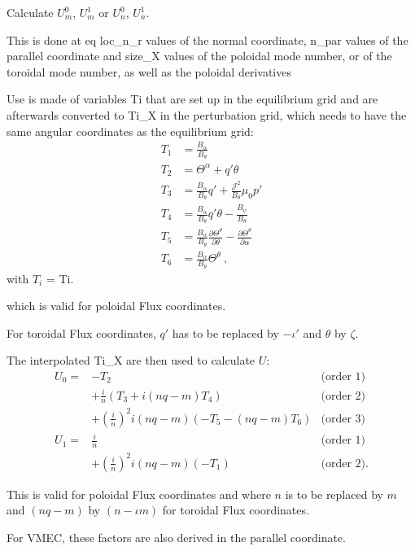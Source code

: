 Calculate $U_m^0$, $U_m^1$ or $U_n^0$, $U_n^1$. 

This is done at eq {\ttfamily loc\+\_\+n\+\_\+r} values of the normal coordinate, {\ttfamily n\+\_\+par} values of the parallel coordinate and {\ttfamily size\+\_\+X} values of the poloidal mode number, or of the toroidal mode number, as well as the poloidal derivatives

Use is made of variables {\ttfamily Ti} that are set up in the equilibrium grid and are afterwards converted to {\ttfamily Ti\+\_\+X} in the perturbation grid, which needs to have the same angular coordinates as the equilibrium grid\+: \[\begin{aligned} T_1 &= \frac{B_\alpha}{B_\theta} \\ T_2 &= \Theta^\alpha + q' \theta \\ T_3 &= \frac{B_\alpha}{B_\theta} q' + \frac{\mathcal{J}^2}{B_\theta} \mu_0 p' \\ T_4 &= \frac{B_\alpha}{B_\theta} q' \theta - \frac{B_\psi}{B_\theta} \\ T_5 &= \frac{B_\alpha}{B_\theta} \frac{\partial \Theta^\theta}{\partial \theta} - \frac{\partial\Theta^\theta}{\partial \alpha} \\ T_6 &= \frac{B_\alpha}{B_\theta} \Theta^\theta \ , \end{aligned}\] with $T_i$ = {\ttfamily Ti}.

which is valid for poloidal Flux coordinates.

For toroidal Flux coordinates, $q'$ has to be replaced by $-\iota'$ and $\theta$ by $\zeta$.

The interpolated {\ttfamily Ti\+\_\+X} are then used to calculate $U$\+: \[\begin{aligned} U_0 =& -T_2 &\text{(order 1)}\\ &+ \frac{i}{n}\left(T_3 + i(nq-m) T_4\right) &\text{(order 2)}\\ &+ \left(\frac{i}{n}\right)^2 i(nq-m) \left(-T_5 - (nq-m) T_6\right) &\text{(order 3)}\\ U_1 =& \frac{i}{n} &\text{(order 1)}\\ &+ \left(\frac{i}{n}\right)^2 i(nq-m)(-T_1) &\text{(order 2)} . \end{aligned}\]

This is valid for poloidal Flux coordinates and where $n$ is to be replaced by $m$ and $(nq-m)$ by $(n-\iota m)$ for toroidal Flux coordinates.

For V\+M\+EC, these factors are also derived in the parallel coordinate.

